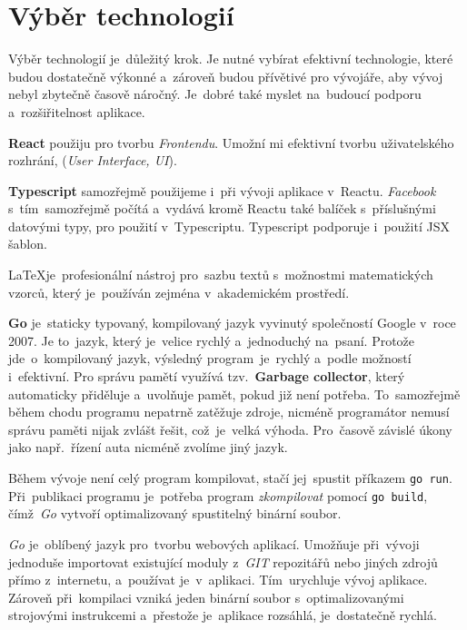 \documentclass[11pt,a4paper]{report}
\begin{document}
        \section{Výběr technologií}
            Výběr technologií je~důležitý krok. Je nutné vybírat efektivní technologie, které budou dostatečně výkonné a~zároveň budou přívětivé pro vývojáře, aby vývoj nebyl zbytečně časově náročný. Je~dobré také myslet na~budoucí podporu a~rozšiřitelnost aplikace.

            \textbf{React} použiju pro tvorbu \emph{Frontendu}. Umožní mi efektivní tvorbu uživatelského rozhrání, (\emph{User Interface, UI}).

            \textbf{Typescript} samozřejmě použijeme i~při vývoji aplikace v~Reactu. \emph{Facebook} s~tím~samozřejmě počítá a~vydává
            kromě Reactu také balíček s~příslušnými datovými typy, pro použití v~Typescriptu. Typescript podporuje i~použití JSX šablon. \cite[Refeerence/Handbook/JSX]{TypeScript}

            \LaTeX je~profesionální nástroj pro~sazbu textů s~možnostmi matematických vzorců, který je~používán zejména v~akademickém prostředí.\cite{Rybicka2003:latex}

            \textbf{Go} je~staticky typovaný, kompilovaný jazyk vyvinutý společností Google v~roce 2007. Je to~jazyk, který je~velice rychlý a~jednoduchý na~psaní. Protože jde~o~kompilovaný jazyk, výsledný program~je~rychlý a~podle možností i~efektivní. Pro správu pamětí využívá tzv.~\textbf{Garbage collector}, který automaticky přiděluje a~uvolňuje pamět, pokud již není potřeba. To~samozřejmě během chodu programu nepatrně zatěžuje zdroje, nicméně programátor nemusí správu paměti nijak zvlášt řešit, což~je~velká výhoda. Pro~časově závislé úkony jako např.~řízení auta nicméně zvolíme jiný jazyk. \cite[7.5]{compilers}
            
            Během vývoje není celý program kompilovat, stačí jej~spustit příkazem \texttt{go run}. Při~publikaci programu je~potřeba program \emph{zkompilovat} pomocí \texttt{go build}, čímž~\emph{Go} vytvoří optimalizovaný spustitelný binární soubor.
            
            \emph{Go} je~oblíbený jazyk pro~tvorbu webových aplikací. Umožňuje při~vývoji jednoduše importovat existující moduly z~\emph{GIT} repozitářů nebo jiných zdrojů přímo z~internetu, a~používat je~v~aplikaci. Tím~urychluje vývoj aplikace. Zároveň při~kompilaci vzniká jeden binární soubor s~optimalizovanými strojovými instrukcemi a~přestože je~aplikace rozsáhlá, je~dostatečně rychlá.
            
\end{document}
